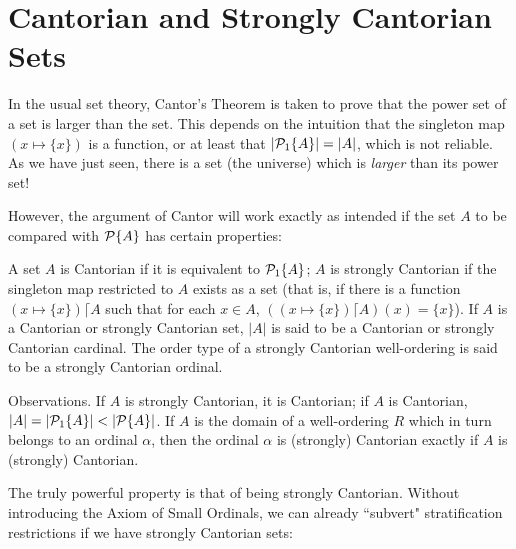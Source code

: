 \section{Cantorian and Strongly Cantorian Sets}

In the usual set theory, Cantor's
Theorem is taken to prove that the power
set of a set is larger than the set.  This depends on the
intuition that the singleton map $(x \mapsto  \{x\})$
is a function, or at least that $|{\cal P}_1\{A\}| = |A|$,
which is not reliable.  As we have just seen, there is a set (the
universe) which is {\itshape larger\/} than its
power set!

However, the argument of Cantor will work exactly as intended
if the set $A$ to be compared with ${\cal P}\{A\}$ has certain properties:

\begin{definition}
 A set $A$ is {\upshape Cantorian} if it is
 equivalent to 
 ${\cal P}_1\{A\}$; $A$ is {\upshape strongly Cantorian\/} if the singleton map
 restricted to $A$ exists as a set (that is, if there is a function
 $(x \mapsto \{x\})\lceil A$ such that for each $x \in A$, $((x \mapsto
 \{x\})\lceil A)(x) = \{x\}$).
 If $A$ is a Cantorian or strongly Cantorian set,
 $|A|$ is said to be a Cantorian or strongly Cantorian
 cardinal.  The
 order type of a strongly Cantorian well-ordering is said to be a strongly
 Cantorian ordinal.
\end{definition}

\begin{ThmEtc}{Observations.}
 If $A$ is strongly Cantorian, it is Cantorian; if $A$ is
 Cantorian, $|A| = |{\cal P}_1\{A\}| < |{\cal P}\{A\}|$.  If $A$ is the
 domain of a well-ordering $R$ which in
 turn belongs to an ordinal $\alpha$, then the ordinal $\alpha$ is (strongly)
 Cantorian exactly if $A$ is (strongly) Cantorian.
\end{ThmEtc}

The truly powerful property is that of being strongly
Cantorian.  Without introducing the Axiom of Small Ordinals, we can already ``subvert" stratification
restrictions if we have strongly 
Cantorian sets:

